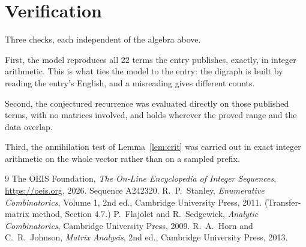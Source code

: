 \documentclass[11pt,a4paper]{article}
\theoremstyle{plain}
\theoremstyle{definition}
\begin{document}
\section{Verification}

Three checks, each independent of the algebra above.

First, the model reproduces all $22$ terms the entry publishes, exactly, in integer
arithmetic. This is what ties the model to the entry: the digraph is built by reading the
entry's English, and a misreading gives different counts.

Second, the conjectured recurrence was evaluated directly on those published terms, with no
matrices involved, and holds wherever the proved range and the data overlap.

Third, the annihilation test of Lemma~\ref{lem:crit} was carried out in exact integer
arithmetic on the whole vector rather than on a sampled prefix.

\begin{thebibliography}{9}
 The OEIS Foundation, \emph{The On-Line Encyclopedia of Integer
Sequences}, \url{https://oeis.org}, 2026. Sequence A242320.
 R.~P.~Stanley, \emph{Enumerative Combinatorics}, Volume 1, 2nd ed.,
Cambridge University Press, 2011. (Transfer-matrix method, Section 4.7.)
 P.~Flajolet and R.~Sedgewick, \emph{Analytic Combinatorics}, Cambridge
University Press, 2009.
 R.~A.~Horn and C.~R.~Johnson, \emph{Matrix Analysis}, 2nd ed., Cambridge
University Press, 2013.
\end{thebibliography}
\end{document}
